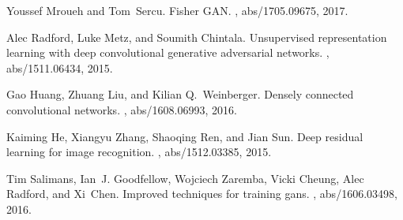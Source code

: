 \documentclass{article}
\begin{document}
\begin{thebibliography}{1}


Youssef Mroueh and Tom~Sercu.
\newblock Fisher {GAN}.
, abs/1705.09675, 2017.

Alec Radford, Luke Metz, and Soumith Chintala.
\newblock Unsupervised representation learning with deep convolutional
  generative adversarial networks.
, abs/1511.06434, 2015.

Gao Huang, Zhuang Liu, and Kilian Q.~Weinberger.
\newblock Densely connected convolutional networks.
, abs/1608.06993, 2016.

Kaiming He, Xiangyu Zhang, Shaoqing Ren, and Jian Sun.
\newblock Deep residual learning for image recognition.
, abs/1512.03385, 2015.

Tim Salimans, Ian~J. Goodfellow, Wojciech Zaremba, Vicki Cheung, Alec Radford,
  and Xi~Chen.
\newblock Improved techniques for training gans.
, abs/1606.03498, 2016.


\end{thebibliography}
\end{document}
